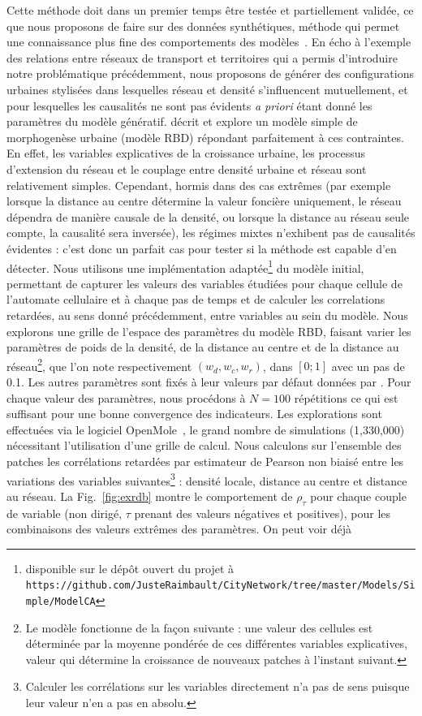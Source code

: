\documentclass[english]{./sageo}
\begin{document}
Cette méthode doit dans un premier temps être testée et partiellement validée, ce que nous proposons de faire sur des données synthétiques, méthode qui permet une connaissance plus fine des comportements des modèles~\cite{raimbaulthalshs01514415}. En écho à l'exemple des relations entre réseaux de transport et territoires qui a permis d'introduire notre problématique précédemment, nous proposons de générer des configurations urbaines stylisées dans lesquelles réseau et densité s'influencent mutuellement, et pour lesquelles les causalités ne sont pas évidents \emph{a priori} étant donné les paramètres du modèle génératif. \cite{raimbault2014hybrid} décrit et explore un modèle simple de morphogenèse urbaine (modèle RBD) répondant parfaitement à ces contraintes. En effet, les variables explicatives de la croissance urbaine, les processus d'extension du réseau et le couplage entre densité urbaine et réseau sont relativement simples. Cependant, hormis dans des cas extrêmes (par exemple lorsque la distance au centre détermine la valeur foncière uniquement, le réseau dépendra de manière causale de la densité, ou lorsque la distance au réseau seule compte, la causalité sera inversée), les régimes mixtes n'exhibent pas de causalités évidentes : c'est donc un parfait cas pour tester si la méthode est capable d'en détecter. Nous utilisons une implémentation adaptée\footnote{disponible sur le dépôt ouvert du projet à\\\texttt{https://github.com/JusteRaimbault/CityNetwork/tree/master/Models/Simple/ModelCA}} du modèle initial, permettant de capturer les valeurs des variables étudiées pour chaque cellule de l'automate cellulaire et à chaque pas de temps et de calculer les correlations retardées, au sens donné précédemment, entre variables au sein du modèle. Nous explorons une grille de l'espace des paramètres du modèle RBD, faisant varier les paramètres de poids de la densité, de la distance au centre et de la distance au réseau\footnote{Le modèle fonctionne de la façon suivante : une valeur des cellules est déterminée par la moyenne pondérée de ces différentes variables explicatives, valeur qui détermine la croissance de nouveaux patches à l'instant suivant.}, que l'on note respectivement $(w_{d},w_{c},w_{r})$, dans $\left[0;1\right]$ avec un pas de 0.1. Les autres paramètres sont fixés à leur valeurs par défaut données par \cite{raimbault2014hybrid}. Pour chaque valeur des paramètres, nous procédons à $N=100$ répétitions ce qui est suffisant pour une bonne convergence des indicateurs. Les explorations sont effectuées via le logiciel OpenMole~\cite{reuillon2013openmole}, le grand nombre de simulations (1,330,000) nécessitant l'utilisation d'une grille de calcul. Nous calculons sur l'ensemble des patches les corrélations retardées par estimateur de Pearson non biaisé entre les variations des variables suivantes\footnote{Calculer les corrélations sur les variables directement n'a pas de sens puisque leur valeur n'en a pas en absolu.} : densité locale, distance au centre et distance au réseau. La Fig.~\ref{fig:exrdb} montre le comportement de $\rho_{\tau}$ pour chaque couple de variable (non dirigé, $\tau$ prenant des valeurs négatives et positives), pour les combinaisons des valeurs extrêmes des paramètres. On peut voir déjà 
\end{document}
